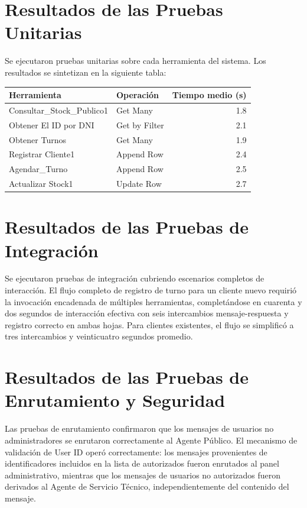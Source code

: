 \documentclass[12pt,a4paper]{report}
\begin{document}
\section{Resultados de las Pruebas Unitarias}

Se ejecutaron pruebas unitarias sobre cada herramienta del sistema. Los resultados se sintetizan en la siguiente tabla:

\begin{center}
\begin{tabular}{llr}
\toprule
Herramienta & Operación & Tiempo medio (s) \\
\midrule
Consultar\_Stock\_Publico1 & Get Many & 1.8 \\
Obtener El ID por DNI & Get by Filter & 2.1 \\
Obtener Turnos & Get Many & 1.9 \\
Registrar Cliente1 & Append Row & 2.4 \\
Agendar\_Turno & Append Row & 2.5 \\
Actualizar Stock1 & Update Row & 2.7 \\
\bottomrule
\end{tabular}
\end{center}

\section{Resultados de las Pruebas de Integración}

Se ejecutaron pruebas de integración cubriendo escenarios completos de interacción. El flujo completo de registro de turno para un cliente nuevo requirió la invocación encadenada de múltiples herramientas, completándose en cuarenta y dos segundos de interacción efectiva con seis intercambios mensaje-respuesta y registro correcto en ambas hojas. Para clientes existentes, el flujo se simplificó a tres intercambios y veinticuatro segundos promedio.

\section{Resultados de las Pruebas de Enrutamiento y Seguridad}

Las pruebas de enrutamiento confirmaron que los mensajes de usuarios no administradores se enrutaron correctamente al Agente Público. El mecanismo de validación de User ID operó correctamente: los mensajes provenientes de identificadores incluidos en la lista de autorizados fueron enrutados al panel administrativo, mientras que los mensajes de usuarios no autorizados fueron derivados al Agente de Servicio Técnico, independientemente del contenido del mensaje.
\end{document}
